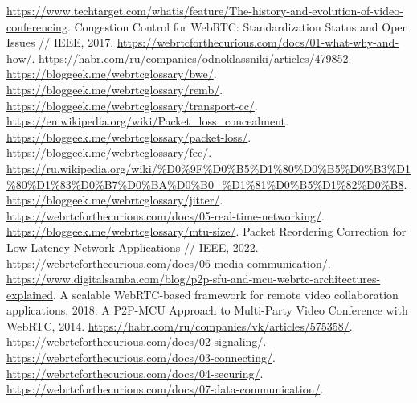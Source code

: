 \documentclass[a4paper,article,14pt]{extarticle}
\begin{document}


\tableofcontents
\pagebreak



















\begin{thebibliography}{1}
 \url{https://www.techtarget.com/whatis/feature/The-history-and-evolution-of-video-conferencing}.
 Congestion Control for WebRTC: Standardization Status and Open Issues // IEEE, 2017.
 \url{https://webrtcforthecurious.com/docs/01-what-why-and-how/}.
 \url{https://habr.com/ru/companies/odnoklassniki/articles/479852}.
 \url{https://bloggeek.me/webrtcglossary/bwe/}.
 \url{https://bloggeek.me/webrtcglossary/remb/}.
 \url{https://bloggeek.me/webrtcglossary/transport-cc/}.
 \url{https://en.wikipedia.org/wiki/Packet_loss_concealment}.
 \url{https://bloggeek.me/webrtcglossary/packet-loss/}.
 \url{https://bloggeek.me/webrtcglossary/fec/}.
 \url{https://ru.wikipedia.org/wiki/%D0%9F%D0%B5%D1%80%D0%B5%D0%B3%D1%80%D1%83%D0%B7%D0%BA%D0%B0_%D1%81%D0%B5%D1%82%D0%B8}.
 \url{https://bloggeek.me/webrtcglossary/jitter/}.
 \url{https://webrtcforthecurious.com/docs/05-real-time-networking/}.
 \url{https://bloggeek.me/webrtcglossary/mtu-size/}.
 Packet Reordering Correction for Low-Latency Network Applications // IEEE, 2022.
 \url{https://webrtcforthecurious.com/docs/06-media-communication/}.
 \url{https://www.digitalsamba.com/blog/p2p-sfu-and-mcu-webrtc-architectures-explained}.
 A scalable WebRTC-based framework for remote video collaboration applications, 2018.
 A P2P-MCU Approach to Multi-Party Video Conference with WebRTC, 2014.
 \url{https://habr.com/ru/companies/vk/articles/575358/}.
 \url{https://webrtcforthecurious.com/docs/02-signaling/}.
 \url{https://webrtcforthecurious.com/docs/03-connecting/}.
 \url{https://webrtcforthecurious.com/docs/04-securing/}.
 \url{https://webrtcforthecurious.com/docs/07-data-communication/}.
\end{thebibliography}
\end{document}

